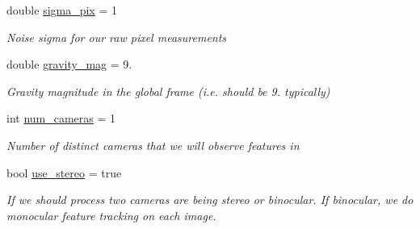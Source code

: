 \begin{DoxyCompactItemize}
\mbox{\label{structov__init_1_1InertialInitializerOptions_ac10140226c97ac5b92f6f72a1f2134df}} 
double \hyperlink{structov__init_1_1InertialInitializerOptions_ac10140226c97ac5b92f6f72a1f2134df}{sigma\+\_\+pix} = 1
\begin{DoxyCompactList}\small\item\em Noise sigma for our raw pixel measurements \end{DoxyCompactList}\item 
\mbox{\label{structov__init_1_1InertialInitializerOptions_a94b223e0b714d700d3b489b3918b002d}} 
double \hyperlink{structov__init_1_1InertialInitializerOptions_a94b223e0b714d700d3b489b3918b002d}{gravity\+\_\+mag} = 9.
\begin{DoxyCompactList}\small\item\em Gravity magnitude in the global frame (i.\+e. should be 9. typically) \end{DoxyCompactList}\item 
\mbox{\label{structov__init_1_1InertialInitializerOptions_a6525a195b4ba524597a0031fa23f65af}} 
int \hyperlink{structov__init_1_1InertialInitializerOptions_a6525a195b4ba524597a0031fa23f65af}{num\+\_\+cameras} = 1
\begin{DoxyCompactList}\small\item\em Number of distinct cameras that we will observe features in \end{DoxyCompactList}\item 
\mbox{\label{structov__init_1_1InertialInitializerOptions_ac0e008a72e6fb14ac129fae7ae62e05b}} 
bool \hyperlink{structov__init_1_1InertialInitializerOptions_ac0e008a72e6fb14ac129fae7ae62e05b}{use\+\_\+stereo} = true
\begin{DoxyCompactList}\small\item\em If we should process two cameras are being stereo or binocular. If binocular, we do monocular feature tracking on each image. \end{DoxyCompactList}\item 
\mbox{\label{structov__init_1_1InertialInitializerOptions_a7bae4984f5ae2416c12a4aa4895018a4}} 

\end{DoxyCompactItemize}
